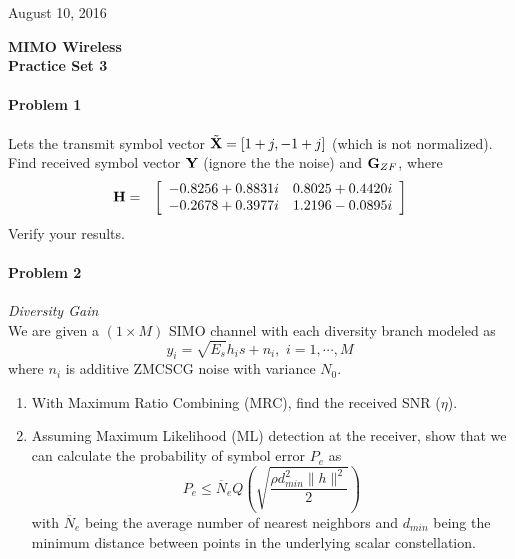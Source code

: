 \documentclass[12pt]{article}
\begin{document}
\hfill August 10, 2016

\begin{center}
{\Large \textbf{MIMO Wireless}}
\\

\textbf{Practice Set 3 }
\end{center}
\paragraph{Problem 1} 
Lets the transmit symbol vector $\tilde{{\bf X}} = [1 + j,-1 + j]$ (which is not normalized). Find received symbol vector ${\bf Y}$ (ignore the the noise) and ${\bf G}_{ZF}$, where  
\begin{eqnarray*}
{\bf H} &=& \left[
\begin{array}{cccc}
-0.8256 + 0.8831i & 0.8025 + 0.4420i \\
-0.2678 + 0.3977i & 1.2196 - 0.0895i
\end{array}
\right]
\end{eqnarray*}
Verify your results.


\paragraph{Problem 2} {\it Diversity Gain}\\
We are given a $(1 \times M)$ SIMO channel with each diversity branch modeled as
\begin{equation*}
y_i = \sqrt{E_s} h_i s + n_i,\,\,i=1,\cdots,M
\end{equation*}
where $n_i$ is additive ZMCSCG noise with variance $ N_0$.
\begin{enumerate}
\item With Maximum Ratio Combining (MRC), find the received SNR ($\eta$). 
\item Assuming Maximum Likelihood (ML) detection at the receiver, show that we can calculate the probability of symbol error $P_e$ as
\begin{equation*}
P_e \leq \overline N_e Q \left(\sqrt{  \frac{  \rho  d_{min}^2 \lVert h \rVert^2}{2}}\right)
\end{equation*}
with $\overline N_e$ being the average number of nearest neighbors and $d_{min}$ being the minimum distance between points in the underlying scalar constellation. 
\end{enumerate}
\end{document}
